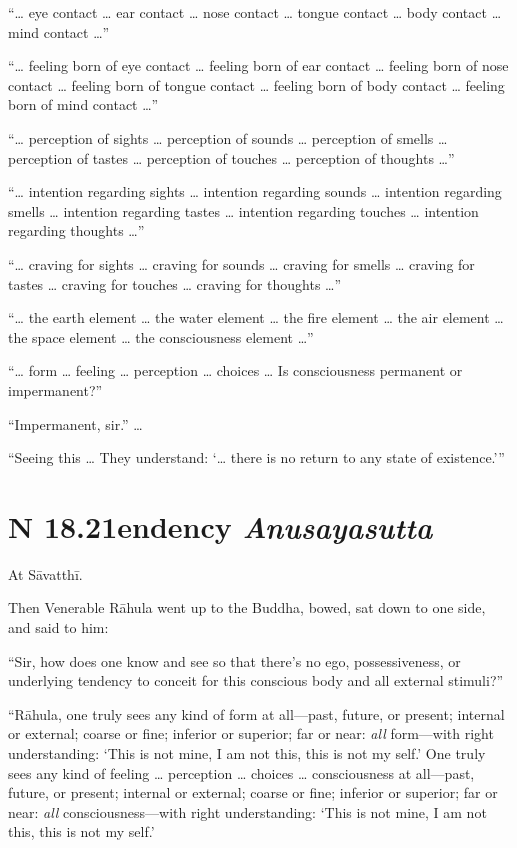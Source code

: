\documentclass[12pt,openany]{book}%
\newcommand*{\suttatitleacronym}[1]{\smaller[2]{#1}\vspace*{.3em}}
\newcommand*{\suttatitletranslation}[1]{\linebreak{#1}}
\newcommand*{\suttatitleroot}[1]{\linebreak\smaller[2]\itshape{#1}}
\newcommand*{\tocacronym}[1]{\hspace*{-3.3em}{#1}\quad}
\newcommand*{\toctranslation}[1]{#1}
\newcommand*{\tocroot}[1]{(\textit{#1})}
\begin{document}
“… eye contact … ear contact … nose contact … tongue contact … body contact … mind contact …” 

“… feeling born of eye contact … feeling born of ear contact … feeling born of nose contact … feeling born of tongue contact … feeling born of body contact … feeling born of mind contact …” 

“… perception of sights … perception of sounds … perception of smells … perception of tastes … perception of touches … perception of thoughts …” 

“… intention regarding sights … intention regarding sounds … intention regarding smells … intention regarding tastes … intention regarding touches … intention regarding thoughts …” 

“… craving for sights … craving for sounds … craving for smells … craving for tastes … craving for touches … craving for thoughts …” 

“… the earth element … the water element … the fire element … the air element … the space element … the consciousness element …” 

“… form … feeling … perception … choices … Is consciousness permanent or impermanent?” 

“Impermanent, sir.” … 

“Seeing this … They understand: ‘… there is no return to any state of existence.’” 

%
\section*{{\suttatitleacronym SN 18.21}{\suttatitletranslation Tendency }{\suttatitleroot Anusayasutta}}
\addcontentsline{toc}{section}{\tocacronym{SN 18.21} \toctranslation{Tendency } \tocroot{Anusayasutta}}

At \textsanskrit{Sāvatthī}. 

Then Venerable \textsanskrit{Rāhula} went up to the Buddha, bowed, sat down to one side, and said to him: 

“Sir, how does one know and see so that there’s no ego, possessiveness, or underlying tendency to conceit for this conscious body and all external stimuli?” 

“\textsanskrit{Rāhula}, one truly sees any kind of form at all—past, future, or present; internal or external; coarse or fine; inferior or superior; far or near: \emph{all} form—with right understanding: ‘This is not mine, I am not this, this is not my self.’ One truly sees any kind of feeling … perception … choices … consciousness at all—past, future, or present; internal or external; coarse or fine; inferior or superior; far or near: \emph{all} consciousness—with right understanding: ‘This is not mine, I am not this, this is not my self.’ 
\end{document}
